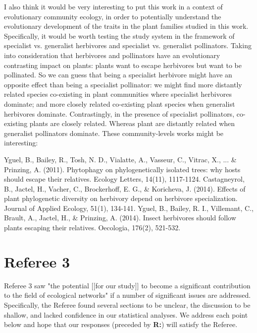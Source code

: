 \documentclass[12pt]{letter}
\newenvironment{refquote}{\bigskip \begin{it}}{\end{it}\smallskip}
\begin{document}
    \begin{refquote}

      I also think it would be very interesting to put this work in a context of evolutionary community ecology, in order to potentially understand the evolutionary development of the traits in the plant families studied in this work. Specifically, it would be worth testing the study system in the framework of specialist vs. generalist herbivores and specialist vs. generalist pollinators. Taking into consideration that herbivores and pollinators have an evolutionary contrasting impact on plants: plants want to escape herbivores but want to be pollinated. So we can guess that being a specialist herbivore might have an opposite effect than being a specialist pollinator: we might find more distantly related species co-existing in plant communities where specialist herbivores dominate; and more closely related co-existing plant species when generalist herbivores dominate. Contrastingly, in the presence of specialist pollinators, co-existing plants are closely related. Whereas plant are distantly related when generalist pollinators dominate. These community-levels works might be interesting:

      \smallskip
      
      Yguel, B., Bailey, R., Tosh, N. D., Vialatte, A., Vasseur, C., Vitrac, X., ... \& Prinzing, A. (2011). Phytophagy on phylogenetically isolated trees: why hosts should escape their relatives. Ecology Letters, 14(11), 1117-1124.
      \smallskip
      Castagneyrol, B., Jactel, H., Vacher, C., Brockerhoff, E. G., \& Koricheva, J. (2014). Effects of plant phylogenetic diversity on  herbivory depend on herbivore specialization. Journal of Applied Ecology, 51(1), 134-141.
      \smallskip
      Yguel, B., Bailey, R. I., Villemant, C., Brault, A., Jactel, H., \& Prinzing, A. (2014). Insect herbivores should follow plants escaping their relatives. Oecologia, 176(2), 521-532.

      \end{refquote}




\section*{Referee 3}

  Referee 3 saw "the potential [[for our study]] to become a significant contribution to the field of ecological networks" if a number of significant issues are addressed. Specifically, the Referee found several sections to be unclear, the discussion to be shallow, and lacked confidence in our statistical analyses. We address each point below and hope that our responses (preceded by \textbf{R:}) will satisfy the Referee.
\end{document}
